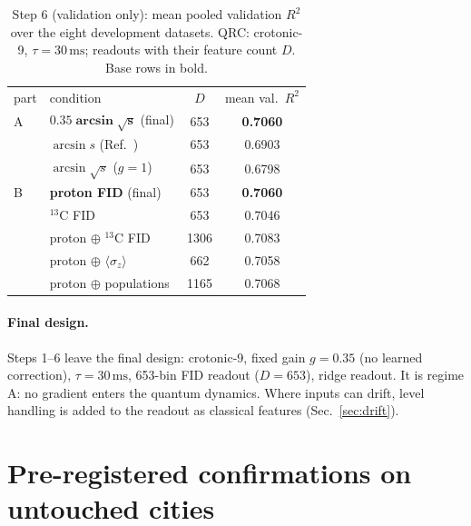 \documentclass[aps,prresearch,preprint,superscriptaddress,amsmath,amssymb,floatfix]{revtex4-2}
\newcommand{\SI}[2]{\ensuremath{#1\,\mathrm{#2}}}
\begin{document}
\begin{table}[t]
\caption{\label{tab:step6}Step 6 (validation only): mean pooled validation $R^2$ over the
eight development datasets. QRC: crotonic-9, $\tau=\SI{30}{ms}$; readouts with their
feature count $D$. Base rows in bold.}
\begin{ruledtabular}
\begin{tabular}{llcc}
part & condition & $D$ & mean val.\ $R^2$ \\ \colrule
A & $\mathbf{0.35\arcsin\sqrt{s}}$ (final) & 653 & \textbf{0.7060} \\
  & $\arcsin s$ (Ref.~\cite{Hou2026}) & 653 & 0.6903 \\
  & $\arcsin\sqrt{s}$ ($g=1$) & 653 & 0.6798 \\ \colrule
B & \textbf{proton FID} (final) & 653 & \textbf{0.7060} \\
  & $^{13}$C FID & 653 & 0.7046 \\
  & proton $\oplus$ $^{13}$C FID & 1306 & 0.7083 \\
  & proton $\oplus$ $\langle\sigma_z\rangle$ & 662 & 0.7058 \\
  & proton $\oplus$ populations & 1165 & 0.7068 \\
\end{tabular}
\end{ruledtabular}
\end{table}

\paragraph*{Final design.} Steps 1--6 leave the final design: crotonic-9, fixed gain
$g=0.35$ (no learned correction), $\tau=\SI{30}{ms}$, 653-bin FID readout ($D=653$),
ridge readout. It is regime A: no gradient enters the quantum dynamics. Where inputs
can drift, level handling is added to the readout as classical features
(Sec.~\ref{sec:drift}).

\section{Pre-registered confirmations on untouched cities}\label{sec:confirm}
\end{document}
